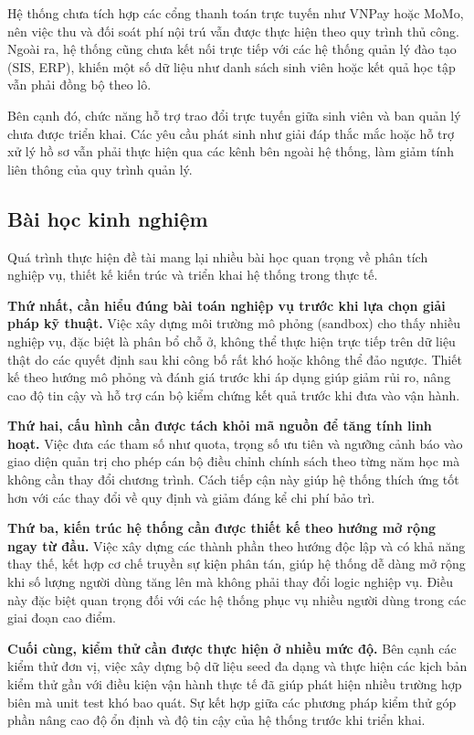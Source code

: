 \documentclass[../DoAn.tex]{subfiles}
\begin{document}
Hệ thống chưa tích hợp các cổng thanh toán trực tuyến như VNPay hoặc MoMo, nên việc thu và đối soát phí nội trú vẫn được thực hiện theo quy trình thủ công. Ngoài ra, hệ thống cũng chưa kết nối trực tiếp với các hệ thống quản lý đào tạo (SIS, ERP), khiến một số dữ liệu như danh sách sinh viên hoặc kết quả học tập vẫn phải đồng bộ theo lô.

Bên cạnh đó, chức năng hỗ trợ trao đổi trực tuyến giữa sinh viên và ban quản lý chưa được triển khai. Các yêu cầu phát sinh như giải đáp thắc mắc hoặc hỗ trợ xử lý hồ sơ vẫn phải thực hiện qua các kênh bên ngoài hệ thống, làm giảm tính liên thông của quy trình quản lý.


\subsection{Bài học kinh nghiệm}
\label{subsection:6.1.4}

Quá trình thực hiện đề tài mang lại nhiều bài học quan trọng về phân tích nghiệp vụ, thiết kế kiến trúc và triển khai hệ thống trong thực tế.

\textbf{Thứ nhất, cần hiểu đúng bài toán nghiệp vụ trước khi lựa chọn giải pháp kỹ thuật.} Việc xây dựng môi trường mô phỏng (sandbox) cho thấy nhiều nghiệp vụ, đặc biệt là phân bổ chỗ ở, không thể thực hiện trực tiếp trên dữ liệu thật do các quyết định sau khi công bố rất khó hoặc không thể đảo ngược. Thiết kế theo hướng mô phỏng và đánh giá trước khi áp dụng giúp giảm rủi ro, nâng cao độ tin cậy và hỗ trợ cán bộ kiểm chứng kết quả trước khi đưa vào vận hành.

\textbf{Thứ hai, cấu hình cần được tách khỏi mã nguồn để tăng tính linh hoạt.} Việc đưa các tham số như quota, trọng số ưu tiên và ngưỡng cảnh báo vào giao diện quản trị cho phép cán bộ điều chỉnh chính sách theo từng năm học mà không cần thay đổi chương trình. Cách tiếp cận này giúp hệ thống thích ứng tốt hơn với các thay đổi về quy định và giảm đáng kể chi phí bảo trì.

\textbf{Thứ ba, kiến trúc hệ thống cần được thiết kế theo hướng mở rộng ngay từ đầu.} Việc xây dựng các thành phần theo hướng độc lập và có khả năng thay thế, kết hợp cơ chế truyền sự kiện phân tán, giúp hệ thống dễ dàng mở rộng khi số lượng người dùng tăng lên mà không phải thay đổi logic nghiệp vụ. Điều này đặc biệt quan trọng đối với các hệ thống phục vụ nhiều người dùng trong các giai đoạn cao điểm.

\textbf{Cuối cùng, kiểm thử cần được thực hiện ở nhiều mức độ.} Bên cạnh các kiểm thử đơn vị, việc xây dựng bộ dữ liệu seed đa dạng và thực hiện các kịch bản kiểm thử gần với điều kiện vận hành thực tế đã giúp phát hiện nhiều trường hợp biên mà unit test khó bao quát. Sự kết hợp giữa các phương pháp kiểm thử góp phần nâng cao độ ổn định và độ tin cậy của hệ thống trước khi triển khai.
\end{document}
